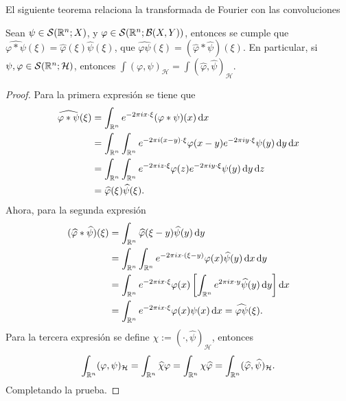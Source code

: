 El siguiente teorema relaciona la transformada de Fourier con las 
convoluciones 
\begin{theorem}
    Sean $\psi\in\mathcal{S}(\mathbb{R}^n;X)$, y $\varphi\in\mathcal{S}(\mathbb{R}^n;\mathcal{B}(X, Y))$, entonces se cumple que 
    $\widehat{\varphi*\psi}(\xi) = \widehat{\varphi}(\xi) 
    \widehat{\psi}(\xi)$, que 
    $\widehat{\varphi\psi}(\xi) = (\widehat{\varphi} * 
    \widehat{\psi})(\xi)$. En particular, si $\psi,\varphi\in\mathcal{S}(\mathbb{R}^n;\mathcal{H})$, entonces  $\int (\varphi,\psi)_\mathcal{H} = \int (\widehat{\varphi},{\widehat{\psi}})_\mathcal{H}$.
    \label{theo:operations-fourier}
\end{theorem}
\begin{proof}
    Para la primera expresión se tiene que 
    \begin{align*}
        \widehat{\varphi*\psi}(\xi) &= 
        \int_{\mathbb{R}^n} e^{-2\pi i x\cdot\xi} (\varphi*\psi)(x)\mathop{}\!\mathrm{d} x \\
        & = \int_{\mathbb{R}^n} \int_{\mathbb{R}^n} e^{-2\pi i (x-y)\cdot\xi} 
        \varphi(x-y)e^{-2\pi i y\cdot\xi} \psi(y) \mathop{}\!\mathrm{d} y \mathop{}\!\mathrm{d} x \\
        & = \int_{\mathbb{R}^n} \int_{\mathbb{R}^n} e^{-2\pi i z\cdot\xi} 
        \varphi(z)e^{-2\pi i y\cdot\xi} \psi(y) \mathop{}\!\mathrm{d} y \mathop{}\!\mathrm{d} z \\
        & = \widehat{\varphi}(\xi)\widehat{\psi}(\xi).
    \end{align*}
    Ahora, para la segunda expresión 
    \begin{align*}
        (\widehat{\varphi} * \widehat{\psi})(\xi) & = 
        \int_{\mathbb{R}^n} \widehat{\varphi}(\xi - y) \widehat{\psi}(y) \mathop{}\!\mathrm{d} y \\
        & = \int_{\mathbb{R}^n} \int_{\mathbb{R}^n} e^{-2\pi i x\cdot(\xi - y)} \varphi(x)
        \widehat{\psi}(y) \mathop{}\!\mathrm{d} x \mathop{}\!\mathrm{d} y \\ 
        & = \int_{\mathbb{R}^n}e^{-2\pi i x\cdot\xi} \varphi(x)  \left[\int_{\mathbb{R}^n}  e^{2\pi i x\cdot y}\widehat{\psi}(y) 
        \mathop{}\!\mathrm{d} y\right] \mathop{}\!\mathrm{d} x \\
        &= \int_{\mathbb{R}^n} e^{-2\pi i x\cdot\xi} \varphi(x) \psi(x) \mathop{}\!\mathrm{d} x = 
        \widehat{\varphi\psi}(\xi).
    \end{align*}
    Para la tercera expresión se define $\chi := (\cdot, \widehat{\psi})_\mathcal{H}$, entonces
    \begin{equation*}
    	\int_{\mathbb{R}^n} (\varphi, \psi)_\mathcal{H} = \int_{\mathbb{R}^n} \widehat{\chi}\varphi  = \int_{\mathbb{R}^n} \chi \widehat{\varphi} = \int_{\mathbb{R}^n} (\widehat{\varphi}, \widehat{\psi})_\mathcal{H}.
    \end{equation*}
    Completando la prueba.
\end{proof}
